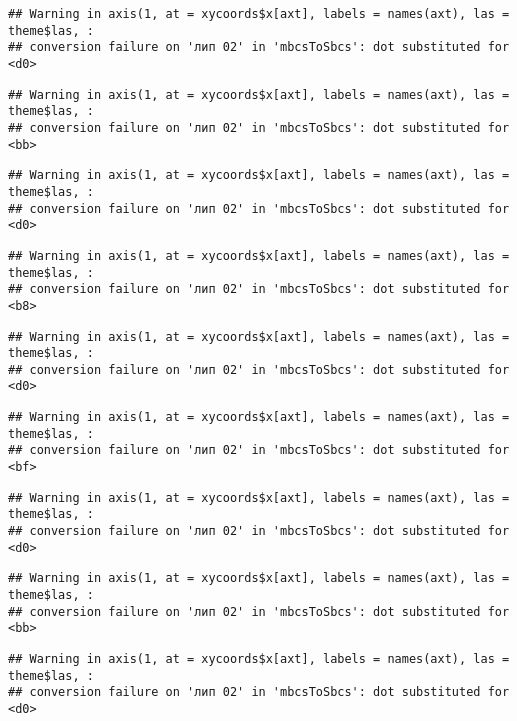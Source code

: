 \documentclass[]{article}
\begin{document}
\begin{verbatim}
## Warning in axis(1, at = xycoords$x[axt], labels = names(axt), las = theme$las, :
## conversion failure on 'лип 02' in 'mbcsToSbcs': dot substituted for <d0>
\end{verbatim}

\begin{verbatim}
## Warning in axis(1, at = xycoords$x[axt], labels = names(axt), las = theme$las, :
## conversion failure on 'лип 02' in 'mbcsToSbcs': dot substituted for <bb>
\end{verbatim}

\begin{verbatim}
## Warning in axis(1, at = xycoords$x[axt], labels = names(axt), las = theme$las, :
## conversion failure on 'лип 02' in 'mbcsToSbcs': dot substituted for <d0>
\end{verbatim}

\begin{verbatim}
## Warning in axis(1, at = xycoords$x[axt], labels = names(axt), las = theme$las, :
## conversion failure on 'лип 02' in 'mbcsToSbcs': dot substituted for <b8>
\end{verbatim}

\begin{verbatim}
## Warning in axis(1, at = xycoords$x[axt], labels = names(axt), las = theme$las, :
## conversion failure on 'лип 02' in 'mbcsToSbcs': dot substituted for <d0>
\end{verbatim}

\begin{verbatim}
## Warning in axis(1, at = xycoords$x[axt], labels = names(axt), las = theme$las, :
## conversion failure on 'лип 02' in 'mbcsToSbcs': dot substituted for <bf>
\end{verbatim}

\begin{verbatim}
## Warning in axis(1, at = xycoords$x[axt], labels = names(axt), las = theme$las, :
## conversion failure on 'лип 02' in 'mbcsToSbcs': dot substituted for <d0>
\end{verbatim}

\begin{verbatim}
## Warning in axis(1, at = xycoords$x[axt], labels = names(axt), las = theme$las, :
## conversion failure on 'лип 02' in 'mbcsToSbcs': dot substituted for <bb>
\end{verbatim}

\begin{verbatim}
## Warning in axis(1, at = xycoords$x[axt], labels = names(axt), las = theme$las, :
## conversion failure on 'лип 02' in 'mbcsToSbcs': dot substituted for <d0>
\end{verbatim}
\end{document}
